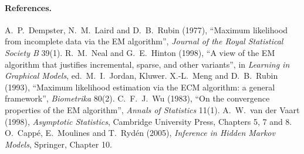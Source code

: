 \paragraph{References.}
A.~P.~Dempster, N.~M.~Laird and D.~B.~Rubin (1977), ``Maximum likelihood from incomplete
data via the EM algorithm'', \emph{Journal of the Royal Statistical Society B} 39(1).
R.~M.~Neal and G.~E.~Hinton (1998), ``A view of the EM algorithm that justifies
incremental, sparse, and other variants'', in \emph{Learning in Graphical Models}, ed.\
M.~I.~Jordan, Kluwer.
X.-L.~Meng and D.~B.~Rubin (1993), ``Maximum likelihood estimation via the ECM algorithm:
a general framework'', \emph{Biometrika} 80(2).
C.~F.~J.~Wu (1983), ``On the convergence properties of the EM algorithm'', \emph{Annals of
Statistics} 11(1).
A.~W.~van der Vaart (1998), \emph{Asymptotic Statistics}, Cambridge University Press,
Chapters 5, 7 and 8.
O.~Capp\'e, E.~Moulines and T.~Ryd\'en (2005), \emph{Inference in Hidden Markov Models},
Springer, Chapter 10.
